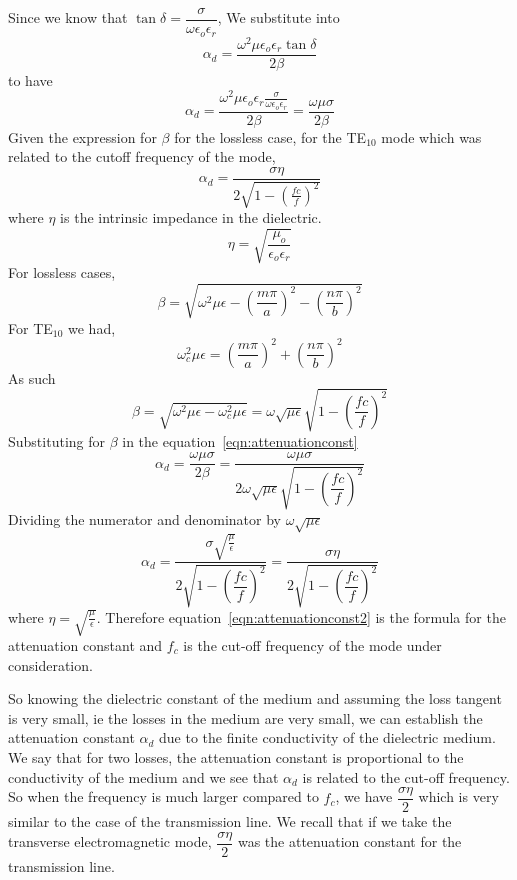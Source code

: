 Since we know that $\tan\delta = \dfrac{\sigma}{\omega\epsilon_{o}\epsilon_{r}}$, We substitute into 
$$\alpha_{d} = \dfrac{\omega^{2}\mu\epsilon_{o}\epsilon_{r}\tan\delta}{2\beta}$$ 
to have 
\begin{dmath}
\alpha_{d} = \dfrac{\omega^{2}\mu\epsilon_{o}\epsilon_{r}\frac{\sigma}{\omega\epsilon_{o}\epsilon_{r}}}{2\beta} = \dfrac{\omega\mu\sigma}{2\beta}
\label{eqn:attenuationconst}
\end{dmath}
Given the expression for $\beta$ for the lossless case, for the TE$_{10}$ mode which was related to the cutoff frequency of the mode, 
$$
\alpha_{d} =  \frac{\sigma\eta}{2\sqrt{1-(\frac{fc}{f})^{2}}}
$$
where $\eta$ is the intrinsic impedance in the dielectric.
$$	
\eta =  \sqrt{\frac{\mu_{o}}{\epsilon_{o}\epsilon_{r}}}
$$
For lossless cases, 
$$\beta = \sqrt{\omega^{2}\mu\epsilon-\left(\dfrac{m\pi}{a}\right)^{2}-\left(\dfrac{n\pi}{b}\right)^{2}}$$
For TE$_{10}$ we had, $$\omega^{2}_{c}\mu\epsilon = \left(\dfrac{m\pi}{a}\right)^{2}+\left(\dfrac{n\pi}{b}\right)^{2}$$	
As such 
\begin{dmath*}
\beta = \sqrt{\omega^{2}\mu\epsilon-\omega^{2}_{c}\mu\epsilon} = \omega\sqrt{\mu\epsilon}\sqrt{1-\left(\dfrac{fc}{f}\right)^{2}}
\end{dmath*}
Substituting for $\beta$ in the equation~\ref{eqn:attenuationconst}
\begin{dmath*}	
\alpha_{d}=\dfrac{\omega\mu\sigma}{2\beta}= \dfrac{\omega\mu\sigma}{2\omega\sqrt{\mu\epsilon}\sqrt{1-\left(\dfrac{fc}{f}\right)^{2}}}
\end{dmath*}
Dividing the numerator and denominator by $\omega\sqrt{\mu\epsilon}$
\begin{dmath}
\alpha_{d} = \dfrac{\sigma\sqrt{\frac{\mu}{\epsilon}}}{2\sqrt{1-\left(\dfrac{fc}{f}\right)^{2}}}=\dfrac{\sigma\eta}{2\sqrt{1 - \left(\dfrac{fc}{f}\right)^{2}}}
\label{eqn:attenuationconst2}
\end{dmath}
where $\eta= \sqrt{\frac{\mu}{\epsilon}}$. Therefore equation~\ref{eqn:attenuationconst2} is the formula for the attenuation constant and $f_c$ is the cut-off frequency of the mode under consideration.

So knowing the dielectric constant of the medium and assuming the loss tangent is very small, ie the losses in the medium are very small, we can establish the attenuation constant $\alpha_{d}$ due to the finite conductivity of the dielectric medium. We say that for two losses, the attenuation constant is proportional to the conductivity of the medium and we see that $\alpha_{d}$ is related to the cut-off frequency. So when the frequency is much larger compared to $f_{c}$, we have $\dfrac{\sigma\eta}{2}$ which is very similar to the case of the transmission line. We recall that if we take the transverse electromagnetic mode, $\dfrac{\sigma\eta}{2}$ was the attenuation constant for the transmission line.

